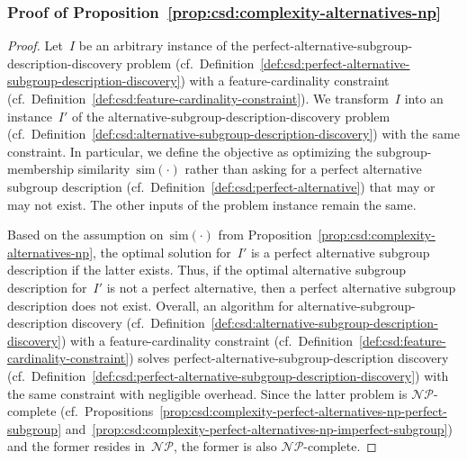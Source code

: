 \subsubsection{Proof of Proposition~\ref{prop:csd:complexity-alternatives-np}}
\label{sec:appendix:csd:proofs:complexity-alternatives-np}

\begin{proof}
	Let~$I$ be an arbitrary instance of the perfect-alternative-subgroup-description-discovery problem (cf.~Definition~\ref{def:csd:perfect-alternative-subgroup-description-discovery}) with a feature-cardinality constraint (cf.~Definition~\ref{def:csd:feature-cardinality-constraint}).
	We transform~$I$ into an instance~$I'$ of the alternative-subgroup-description-discovery problem (cf.~Definition~\ref{def:csd:alternative-subgroup-description-discovery}) with the same constraint.
	In particular, we define the objective as optimizing the subgroup-membership similarity~$\text{sim}(\cdot)$ rather than asking for a perfect alternative subgroup description (cf.~Definition~\ref{def:csd:perfect-alternative}) that may or may not exist.
	The other inputs of the problem instance remain the same.
	
	Based on the assumption on~$\text{sim}(\cdot)$ from Proposition~\ref{prop:csd:complexity-alternatives-np}, the optimal solution for~$I'$ is a perfect alternative subgroup description if the latter exists.
	Thus, if the optimal alternative subgroup description for~$I'$ is not a perfect alternative, then a perfect alternative subgroup description does not exist.
	Overall, an algorithm for alternative-subgroup-description discovery (cf.~Definition~\ref{def:csd:alternative-subgroup-description-discovery}) with a feature-cardinality constraint (cf.~Definition~\ref{def:csd:feature-cardinality-constraint}) solves perfect-alternative-subgroup-description discovery (cf.~Definition~\ref{def:csd:perfect-alternative-subgroup-description-discovery}) with the same constraint with negligible overhead.
	Since the latter problem is $\mathcal{NP}$-complete (cf.~Propositions~\ref{prop:csd:complexity-perfect-alternatives-np-perfect-subgroup} and~\ref{prop:csd:complexity-perfect-alternatives-np-imperfect-subgroup}) and the former resides in~$\mathcal{NP}$, the former is also $\mathcal{NP}$-complete.
\end{proof}
